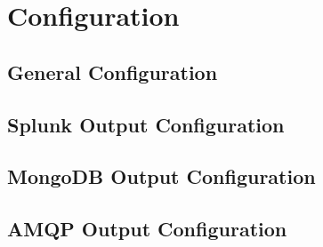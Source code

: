 \chapter{Configuration}\label{chap:configuration}


\section{General Configuration}
\section{Splunk Output Configuration}
\section{MongoDB Output Configuration}
\section{AMQP Output Configuration}

